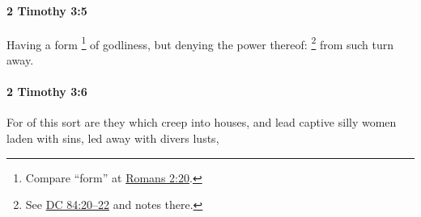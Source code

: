 		\paragraph{2 Timothy 3:5} %
			\label{2TIMOTHY-3-5}

			Having a form%
				\footnote{%
					Compare ``form'' at \hyperref[ROMANS-2-20]{Romans 2:20}.
					}
			of godliness, but denying the power thereof:%
				\footnote{%
					See \hyperref[DC84-20]{DC 84:20--22} and notes there.
					}
			from such turn away.

			\begin{framed}
			\scriptsize
				\begin{compactdesc}
					\item[SBLG] 
				\end{compactdesc}
			\end{framed}

		\paragraph{2 Timothy 3:6} %
			\label{2TIMOTHY-3-6}

			For of this sort are they which creep into houses, and lead captive silly women laden with sins, led away with divers lusts,

